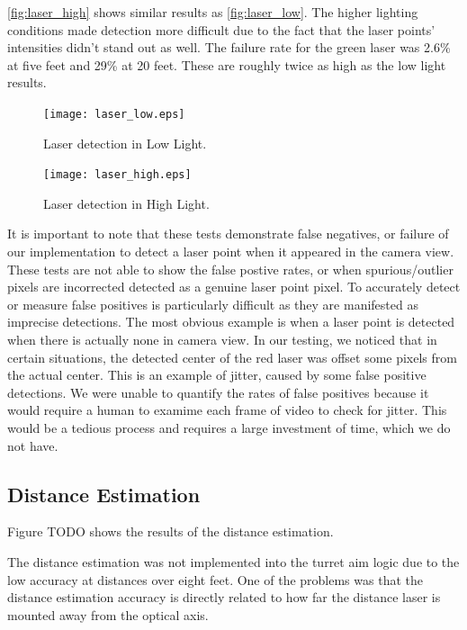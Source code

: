 \documentclass[10pt,twocolumn,letterpaper]{article}
\begin{document}
\ref{fig:laser_high} shows similar results as \ref{fig:laser_low}. The higher lighting conditions made detection more difficult due to the fact that the laser points' intensities didn't stand out as well. The failure rate for the green laser was 2.6\% at five feet and 29\% at 20 feet. These are roughly twice as high as the low light results.

\begin{figure}[t]
\begin{center}
  \texttt{[image: laser\_low.eps]}
\end{center}
   \caption{Laser detection in Low Light.}
\label{fig:laser_low}
\label{fig:long}
\label{fig:onecol}
\end{figure}

\begin{figure}[t]
\begin{center}
  \texttt{[image: laser\_high.eps]}
\end{center}
   \caption{Laser detection in High Light.}
\label{fig:laser_high}
\label{fig:long}
\label{fig:onecol}
\end{figure}

It is important to note that these tests demonstrate false negatives, or failure of our implementation to detect a laser point when it appeared in the camera view.  These tests are not able to show the false postive rates, or when spurious/outlier pixels are incorrected detected as a genuine laser point pixel.  To accurately detect or measure false positives is particularly difficult as they are manifested as imprecise detections.  The most obvious example is when a laser point is detected when there is actually none in camera view.  In our testing, we noticed that in certain situations, the detected center of the red laser was offset some pixels from the actual center.  This is an example of jitter, caused by some false positive detections.  We were unable to quantify the rates of false positives because it would require a human to examime each frame of video to check for jitter.  This would be a tedious process and requires a large investment of time, which we do not have.

\subsection{Distance Estimation}

Figure TODO shows the results of the distance estimation.

The distance estimation was not implemented into the turret aim logic due to the low accuracy at distances over eight feet. One of the problems was that the distance estimation accuracy is directly related to how far the distance laser is mounted away from the optical axis.  
\end{document}

